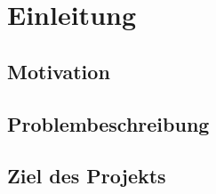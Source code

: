 \chapter{Einleitung}


\section{Motivation}


\section{Problembeschreibung}


\section{Ziel des Projekts}